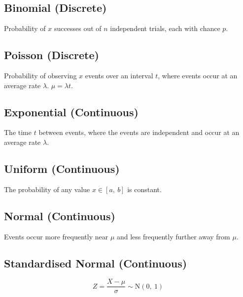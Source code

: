 \documentclass{article}
\begin{document}
\begin{minipage}{62.39259259mm}
    \subsection*{Binomial (Discrete)}
    Probability of \(x\) successes out of \(n\) independent trials, each with chance \(p\).
    \subsection*{Poisson (Discrete)}
    Probability of observing \(x\) events over an interval \(t\), where events occur at an
    average rate \(\lambda\). \(\mu = \lambda t\).
    \subsection*{Exponential (Continuous)}
    The time \(t\) between events, where the events are independent and occur at an average rate \(\lambda\).
    \subsection*{Uniform (Continuous)}
    The probability of any value \(x\in\left[ a,\: b \right]\) is constant.
    \subsection*{Normal (Continuous)}
    Events occur more frequently near \(\mu\) and less frequently further away from \(\mu\).
    \subsection*{Standardised Normal (Continuous)}
    \begin{equation*}
        Z = \frac{X-\mu}{\sigma} \sim \mathrm{N}\left( 0,\: 1 \right)
    \end{equation*}
\end{minipage}
\end{document}
